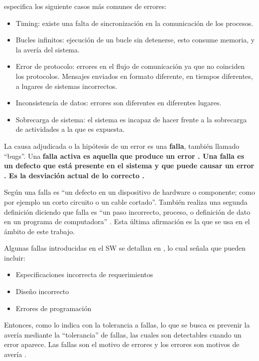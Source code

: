 \cite{Hanmer07} especifica los siguiente casos más comunes de errores:
\begin{itemize}
 \item Timing: existe una falta de sincronización en la comunicación de los procesos.
 \item Bucles infinitos: ejecución de un bucle sin detenerse, esto consume memoria, y la
avería del sistema.
 \item Error de protocolo: errores en el flujo de comunicación ya que no coinciden los 
protocolos. Mensajes enviados en formato diferente, en tiempos diferentes, a lugares de sistemas 
incorrectos.
 \item Inconsistencia de datos: errores son diferentes en diferentes lugares.
 \item Sobrecarga de sistema: el sistema es incapaz de hacer frente a la sobrecarga de 
actividades a la que es expuesta.
\end{itemize}

La causa adjudicada o la hipótesis de un error es una \textbf{falla}, también llamado ``bugs''. Una 
\bf{falla activa} es aquella que produce un error \citep{Pullum01}. Una falla es un defecto que está 
presente en el sistema y que puede causar un error \citep{Hanmer07}. Es la desviación actual de lo 
correcto \cite{Hanmer07}.

Según \cite{IEEE610.12} una falla es ``un defecto en un dispositivo de hardware o componente; como 
por ejemplo un corto circuito o un cable cortado''. También realiza una segunda definición diciendo 
que falla es ``un paso incorrecto, proceso, o definición de dato en un programa de computadora'' 
\cite{IEEE610.12}. Esta última afirmación es la que se usa en el ámbito de este trabajo.

Algunas fallas introducidas en el \ac{SW} se detallan en \cite{Hanmer07}, lo cual señala que 
pueden incluir:
\begin{itemize}
 \item Especificaciones incorrecta de requerimientos
 \item Diseño incorrecto
 \item Errores de programación
\end{itemize}

Entonces, como lo indica \cite{Pullum01} con la tolerancia a fallas, lo que se busca es prevenir la 
avería mediante la ``tolerancia'' de fallas, las cuales son detectables cuando un error aparece. 
Las fallas son el motivo de errores y los errores son motivos de avería \citep{FTDesign}.

